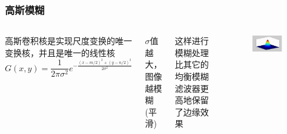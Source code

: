 \documentclass[presentation,aspectratio=1610]{beamer}
\begin{document}
\begin{frame}
	\frametitle{高斯模糊}
	\begin{columns}
	高斯卷积核是实现尺度变换的唯一变换核，并且是唯一的线性核\\	
	\begin{equation*} 
	G(x, y)=\frac{1}{2 \pi \sigma^{2}} e^{-\frac{(x-m / 2)^{2}+(y-n / 2)^{2}}{2 \sigma^{2}}}
	\end{equation*}	
	
	$\sigma$值越大，图像越模糊(平滑) \vspace{.4cm}
	
	这样进行模糊处理比其它的均衡模糊滤波器更高地保留了边缘效果
	
		\begin{figure}[htbp!]
			\centering
			\includegraphics[width=0.9\textwidth]{img/gass.jpg}
		\end{figure}
		
	\end{columns}	
\end{frame}
\end{document}
